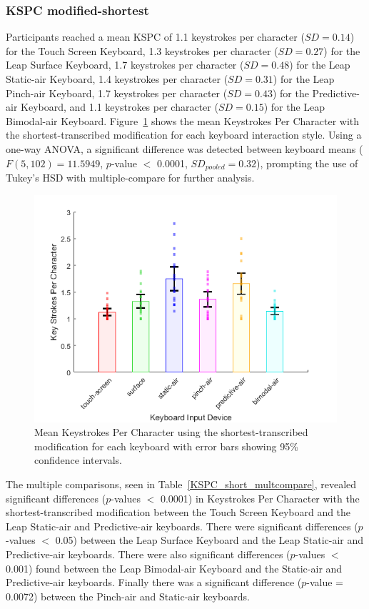 \subsubsection{KSPC modified-shortest}
Participants reached a mean KSPC of 1.1 keystrokes per character ($SD = 0.14$) for the Touch Screen Keyboard, 1.3 keystrokes per character ($SD = 0.27$) for the Leap Surface Keyboard, 1.7 keystrokes per character ($SD = 0.48$) for the Leap Static-air Keyboard, 1.4 keystrokes per character ($SD = 0.31$) for the Leap Pinch-air Keyboard, 1.7 keystrokes per character ($SD = 0.43$) for the Predictive-air Keyboard, and 1.1 keystrokes per character ($SD = 0.15$) for the Leap Bimodal-air Keyboard. Figure~\ref{fig_KSPC_short_mean} shows the mean Keystrokes Per Character with the shortest-transcribed modification for each keyboard interaction style. Using a one-way ANOVA, a significant difference was detected between keyboard means ($F(5, 102) = 11.5949$, $p$-value $<$ 0.0001, $SD_{pooled} = 0.32$), prompting the use of Tukey's HSD with multiple-compare for further analysis.

\begin{figure}[!t]
	\centering
	\includegraphics{Figures/fig_KSPC_short_mean}
	\caption[Mean Keystrokes Per Character for Modified-shortest]{Mean Keystrokes Per Character using the shortest-transcribed modification for each keyboard with error bars showing 95\% confidence intervals.}
	\label{fig_KSPC_short_mean}
\end{figure}

The multiple comparisons, seen in Table~\ref{KSPC_short_multcompare}, revealed significant differences ($p$-values $<$ 0.0001) in Keystrokes Per Character with the shortest-transcribed modification between the Touch Screen Keyboard and the Leap Static-air and Predictive-air keyboards. There were significant differences ($p$-values $<$ 0.05) between the Leap Surface Keyboard and the Leap Static-air and Predictive-air keyboards. There were also significant differences ($p$-values $<$ 0.001) found between the Leap Bimodal-air Keyboard and the Static-air and Predictive-air keyboards. Finally there was a significant difference ($p$-value = 0.0072) between the Pinch-air and Static-air keyboards.

